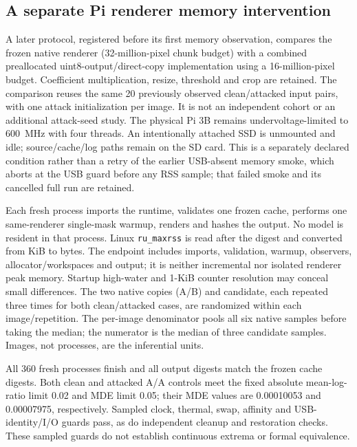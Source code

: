 \subsection{A separate Pi renderer memory intervention}
\label{app:seg-pi3b-memory}
A later protocol, registered before its first memory observation, compares
the frozen native renderer (32-million-pixel chunk budget) with a combined
preallocated uint8-output/direct-copy implementation using a 16-million-pixel
budget. Coefficient multiplication, resize, threshold and crop are retained.
The comparison reuses the same 20 previously observed clean/attacked input
pairs, with one attack initialization per image. It is not an independent
cohort or an additional attack-seed study. The physical Pi 3B remains
undervoltage-limited to 600~MHz with four threads. An intentionally attached
SSD is unmounted and idle; source/cache/log paths remain on the SD card.
This is a separately declared condition rather than a retry of the earlier
USB-absent memory smoke, which aborts at the USB guard before any RSS sample;
that failed smoke and its cancelled full run are retained.

Each fresh process imports the runtime, validates one frozen cache, performs
one same-renderer single-mask warmup, renders and hashes the output. No model
is resident in that process. Linux \texttt{ru\_maxrss} is read after the digest
and converted from KiB to bytes. The endpoint includes imports, validation,
warmup, observers, allocator/workspaces and output; it is neither incremental
nor isolated renderer peak memory. Startup high-water and 1-KiB counter
resolution may conceal small differences. The two native copies (A/B) and
candidate, each repeated three times for both clean/attacked cases, are
randomized within each image/repetition. The per-image denominator pools all
six native samples before taking the median; the numerator is the median of
three candidate samples. Images, not processes, are the inferential units.

All 360 fresh processes finish and all output digests match the
frozen cache digests. Both clean and attacked A/A controls meet the fixed
absolute mean-log-ratio limit 0.02 and MDE limit 0.05; their MDE values are
0.00010053 and 0.00007975, respectively.
Sampled clock, thermal, swap, affinity and USB-identity/I/O guards pass,
as do independent cleanup and restoration checks. These sampled guards do
not establish continuous extrema or formal equivalence.

